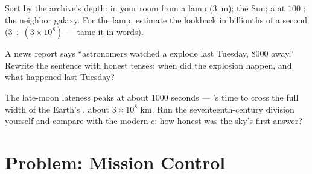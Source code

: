 \begin{exercise}[$\star\star$]\label{exo:g8:speed-of-light:10}
Sort by the archive's depth:  in your room from a lamp
(\qty{3}{m}); the Sun; a  at $100$ ; the
neighbor galaxy. For the lamp, estimate the lookback in
billionths of a second ($3 \div (3 \times 10^{8})$ ---
tame it in words).
\end{exercise}

\begin{exercise}[$\star\star$]\label{exo:g8:speed-of-light:11}
A news report says ``astronomers watched a  explode
last Tuesday, $8000$  away.'' Rewrite the
sentence with honest tenses: when did the explosion happen,
and what happened last Tuesday?
\end{exercise}

\begin{exercise}[$\star\star\star$]\label{exo:g8:speed-of-light:12}
The late-moon lateness peaks at about $1000$ seconds ---
's time to cross the full width of the Earth's ,
about $3 \times 10^{8}$ km. Run the seventeenth-century
division yourself and compare with the modern $c$: how
honest was the sky's first answer?
\end{exercise}

\section{Problem: Mission Control}


